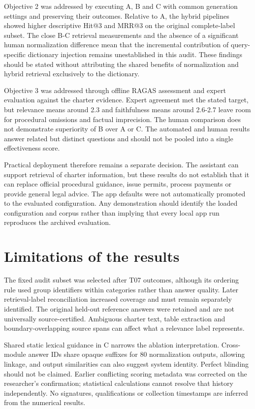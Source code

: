 Objective 2 was addressed by executing A, B and C with common generation settings and preserving their outcomes. Relative to A, the hybrid pipelines showed higher descriptive Hit@3 and MRR@3 on the original complete-label subset. The close B-C retrieval measurements and the absence of a significant human normalization difference mean that the incremental contribution of query-specific dictionary injection remains unestablished in this audit. These findings should be stated without attributing the shared benefits of normalization and hybrid retrieval exclusively to the dictionary.


Objective 3 was addressed through offline RAGAS assessment and expert evaluation against the charter evidence. Expert agreement met the stated target, but relevance means around 2.3 and faithfulness means around 2.6-2.7 leave room for procedural omissions and factual imprecision. The human comparison does not demonstrate superiority of B over A or C. The automated and human results answer related but distinct questions and should not be pooled into a single effectiveness score.


Practical deployment therefore remains a separate decision. The assistant can support retrieval of charter information, but these results do not establish that it can replace official procedural guidance, issue permits, process payments or provide general legal advice. The app defaults were not automatically promoted to the evaluated configuration. Any demonstration should identify the loaded configuration and corpus rather than implying that every local app run reproduces the archived evaluation.


\section{Limitations of the results}

The fixed audit subset was selected after T07 outcomes, although its ordering rule used group identifiers within categories rather than answer quality. Later retrieval-label reconciliation increased coverage and must remain separately identified. The original held-out reference answers were retained and are not universally source-certified. Ambiguous charter text, table extraction and boundary-overlapping source spans can affect what a relevance label represents.


Shared static lexical guidance in C narrows the ablation interpretation. Cross-module answer IDs share opaque suffixes for 80 normalization outputs, allowing linkage, and output similarities can also suggest system identity. Perfect blinding should not be claimed. Earlier conflicting scoring metadata was corrected on the researcher's confirmation; statistical calculations cannot resolve that history independently. No signatures, qualifications or collection timestamps are inferred from the numerical results.


